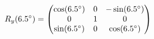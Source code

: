 \documentclass[preview]{standalone}
\begin{document}
\begin{align*}
\special{dvisvgm:raw <g id='unique000'>}R_y(6.5^\circ) = \begin{pmatrix} \cos(6.5^\circ) & 0 & -\sin(6.5^\circ) \\ 0 & 1 & 0 \\ \sin(6.5^\circ) & 0 & \cos(6.5^\circ) \end{pmatrix}\special{dvisvgm:raw </g>}
\end{align*}
\end{document}
